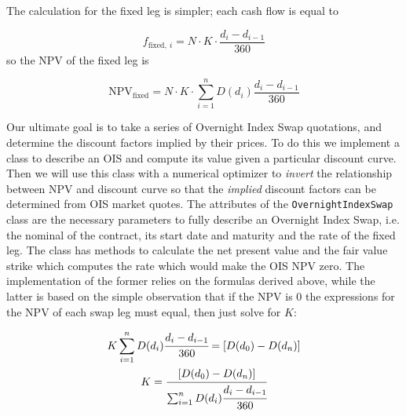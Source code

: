 The calculation for the fixed leg is simpler; each cash flow is equal to

\begin{equation}
f_{\mathrm{fixed},~i}=N\cdot K\cdot \frac{d_i - d_{i-1}}{360}
\end{equation}
so the NPV of the fixed leg is

\begin{equation}
\mathrm{NPV}_{\mathrm{fixed}} = N\cdot K\cdot \sum_{i=1}^{n}D(d_{i})\frac{d_i - d_{i-1}}{360}
\end{equation}


\begin{finmarkets}
Our ultimate goal is to take a series of Overnight Index Swap quotations, and determine the discount factors implied by their prices. To do this we implement a class to describe an OIS and compute its value given a particular discount curve. Then we will use this class with a numerical optimizer to \emph{invert} the relationship between NPV and discount curve so that the \emph{implied} discount factors can be determined from OIS market quotes.
The attributes of the \texttt{OvernightIndexSwap} class are the necessary parameters to fully describe an Overnight Index Swap, i.e. the nominal of the contract, its start date and maturity and the rate of the fixed leg. The class has methods to calculate the net present value and the fair value strike which computes the rate which would make the OIS NPV zero. The implementation of the former relies on the formulas derived above, while the latter is based on the simple observation that if the NPV is 0 the expressions for the NPV of each swap leg must equal, then just solve for $K$:

\begin{equation}
\begin{gathered}
K \sum_{i=1}^{n}D(d_{i})\cfrac{d_i - d_{i-1}}{360} = [D(d_0) - D(d_n)] \\
K = \cfrac{[D(d_0) - D(d_n)]}{\sum_{i=1}^{n}D(d_{i})\cfrac{d_i - d_{i-1}}{360}}
\end{gathered}
\end{equation}
\end{finmarkets}


